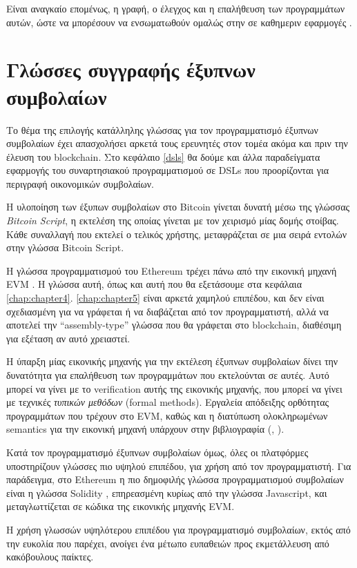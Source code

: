 Είναι αναγκαίο επομένως, η γραφή, ο έλεγχος και η επαλήθευση των προγραμμάτων
αυτών, ώστε να μπορέσουν να ενσωματωθούν ομαλώς στην σε καθημεριν εφαρμογές .


\section{Γλώσσες συγγραφής έξυπνων συμβολαίων}

Το θέμα της επιλογής κατάλληλης γλώσσας για τον προγραμματισμό έξυπνων
συμβολαίων έχει  απασχολήσει αρκετά τους ερευνητές στον τομέα ακόμα και πριν
την έλευση του blockchain. Στο κεφάλαιο \ref{dsls} θα δούμε και άλλα
παραδείγματα εφαρμογής του συναρτησιακού προγραμματισμού σε DSLs που
προορίζονται για περιγραφή οικονομικών συμβολαίων.

Η υλοποίηση των έξυπων συμβολαίων στο Bitcoin γίνεται δυνατή μέσω
της γλώσσας \textit{Bitcoin Script}, η εκτελέση της οποίας
γίνεται με τον χειρισμό μίας δομής στοίβας. Κάθε συναλλαγή που
εκτελεί ο τελικός χρήστης, μεταφράζεται σε μια σειρά εντολών στην
γλώσσα Bitcoin Script.

Η γλώσσα προγραμματισμού του Ethereum τρέχει πάνω από την εικονική μηχανή  EVM
\cite{ethereum}. Η γλώσσα αυτή, όπως και αυτή που θα εξετάσουμε στα κεφάλαια
\ref{chap:chapter4}. \ref{chap:chapter5} είναι αρκετά χαμηλού επιπέδου, και δεν
είναι σχεδιασμένη για να γράφεται ή να διαβάζεται από τον προγραμματιστή, αλλά
να αποτελεί την ``assembly-type'' γλώσσα που θα γράφεται στο blockchain,
διαθέσιμη για εξέταση αν αυτό χρειαστεί.

Η ύπαρξη μίας εικονικής μηχανής για την εκτέλεση έξυπνων συμβολαίων δίνει την
δυνατότητα για επαλήθευση των προγραμμάτων που εκτελούνται σε αυτές. Αυτό
μπορεί να γίνει με το verification αυτής της εικονικής μηχανής, που μπορεί να
γίνει με τεχνικές \emph{τυπικών μεθόδων} (formal methods). Εργαλεία απόδειξης
ορθότητας προγραμμάτων που τρέχουν στο EVM, καθώς και η διατύπωση ολοκληρωμένων
semantics για την εικονική μηχανή υπάρχουν στην βιβλιογραφία
(\cite{evmverification}, \cite{kevmverification}).

Κατά τον προγραμματισμό έξυπνων συμβολαίων όμως, όλες οι πλατφόρμες
υποστηρίζουν γλώσσες πιο υψηλού επιπέδου, για χρήση από τον προγραμματιστή. Για
παράδειγμα, στο Ethereum η πιο δημοφιλής γλώσσα προγραμματισμού συμβολαίων
είναι η γλώσσα Solidity \cite{solidity}, επηρεασμένη κυρίως από την γλώσσα
Javascript, και μεταγλωττίζεται σε κώδικα της εικονικής μηχανής EVM.

Η χρήση γλωσσών υψηλότερου επιπέδου για προγραμματισμό συμβολαίων, εκτός από
την ευκολία που παρέχει, ανοίγει ένα μέτωπο ευπαθειών προς εκμετάλλευση από
κακόβουλους παίκτες.


